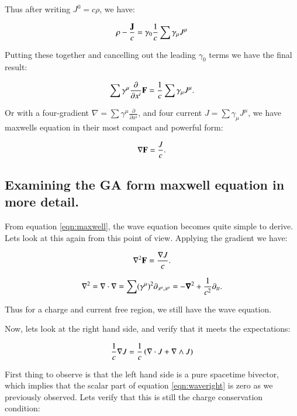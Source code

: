 \documentclass{article}      %
\newcommand{\spacegrad}[0]{\boldsymbol{\nabla}}
\newcommand{\grad}[0]{\nabla}
\begin{document}
Thus after writing $J^0 = c \rho$, we have:

\begin{equation*}
\rho - \frac{\mathbf{J}}{c} = \gamma_0 \frac{1}{c} \sum \gamma_{\mu} J^{\mu}
\end{equation*}

Putting these together and cancelling out the leading $\gamma_0$ terms we have the final result:

\begin{equation}
\sum \gamma^{\mu} \frac{\partial}{\partial x^i} \mathbf{F} = \frac{1}{c} \sum \gamma_{\mu} J^{\mu}.
\end{equation}

Or with a four-gradient $\grad = \sum \gamma^{\mu} \frac{\partial}{\partial x^i}$, and four current $J = \sum \gamma_{\mu} J^{\mu}$, we have maxwells equation in their most compact and powerful form:

\begin{equation}\label{eqn:maxwell}
\grad \BF = \frac{J}{c}.
\end{equation}

\subsection{ Examining the GA form maxwell equation in more detail. }

From equation \ref{eqn:maxwell}, the wave equation becomes quite simple to derive.  Lets look at this again from this point of
view.  Applying the gradient we have:

\begin{equation}
\grad^2 \BF = \frac{\grad J}{c}.
\end{equation}

\begin{equation}
\grad^2 = \grad \cdot \grad = \sum (\gamma^{\mu})^2 \partial_{x^{\mu},x^{\mu}} = -\spacegrad^2 + \inv{c^2}\partial_{tt}.
\end{equation}

Thus for a charge and current free region, we still have the wave equation.

Now, lets look at the right hand side, and verify that it meets the expectations:

\begin{equation}\label{eqn:waveright}
\inv{c}\grad J = \inv{c}\left(\grad \cdot J + \grad \wedge J\right)
\end{equation}

First thing to observe is that the left hand side is a pure spacetime bivector, which implies that the scalar part of 
equation \ref{eqn:waveright} is zero as we previously observed.  Lets verify that this is still the charge conservation
condition:
\end{document}

